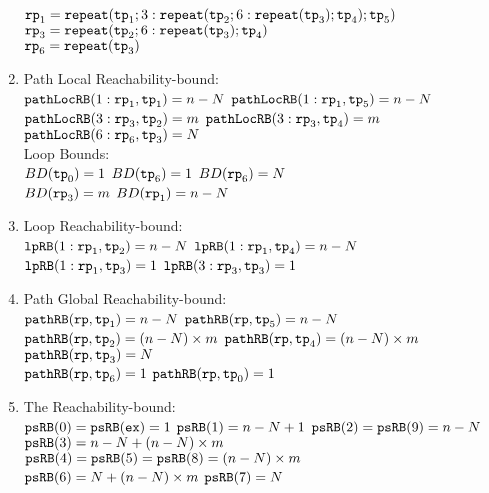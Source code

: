 \begin{enumerate}
$\mathtt{rp}_1 = \mathtt{repeat}(\mathtt{tp}_1; 3: \mathtt{repeat}(\mathtt{tp}_2; 6: \mathtt{repeat}(\mathtt{tp}_3); \mathtt{tp}_4); \mathtt{tp}_5)$
\\
$\mathtt{rp}_3 = \mathtt{repeat}(\mathtt{tp}_2; 6: \mathtt{repeat}(\mathtt{tp}_3); \mathtt{tp}_4)$
\\
$\mathtt{rp}_6 = \mathtt{repeat}(\mathtt{tp}_3)$
  \item {Path Local Reachability-bound}:
\\
$\mathtt{pathLocRB}(1: \mathtt{rp}_1, \mathtt{tp}_1) = n - N$ \quad
$\mathtt{pathLocRB}(1: \mathtt{rp}_1, \mathtt{tp}_5) = n - N$ \\
$\mathtt{pathLocRB}(3: \mathtt{rp}_3, \mathtt{tp}_2) = m$ \quad
$\mathtt{pathLocRB}(3: \mathtt{rp}_3, \mathtt{tp}_4) = m$ \\
$\mathtt{pathLocRB}(6: \mathtt{rp}_6, \mathtt{tp}_3) = N$ \quad
%
\\
Loop Bounds:
\\
$BD(\mathtt{tp}_0) = 1$
\quad
$BD(\mathtt{tp}_6) = 1$
\quad
$BD( \mathtt{rp}_6) = N $
\\
$BD(\mathtt{rp}_3) = m $
\quad
$BD(\mathtt{rp}_1) = n - N $
%
\item Loop Reachability-bound:
\\
$\mathtt{lpRB}(1: \mathtt{rp}_1, \mathtt{tp}_2) = n - N$ \quad 
$\mathtt{lpRB}(1: \mathtt{rp}_1, \mathtt{tp}_4) = n - N$ \\
$\mathtt{lpRB}(1: \mathtt{rp}_1, \mathtt{tp}_3) = 1$ \quad
$\mathtt{lpRB}(3: \mathtt{rp}_3, \mathtt{tp}_3) = 1$ \quad 
%
%
\item Path Global Reachability-bound:
\\
$\mathtt{pathRB}(\mathtt{rp}, \mathtt{tp}_1) = n - N$ \quad
$\mathtt{pathRB}(\mathtt{rp}, \mathtt{tp}_5) = n - N$ \quad
\\
$\mathtt{pathRB}(\mathtt{rp}, \mathtt{tp}_2) = (n - N) \times m$ \quad
$\mathtt{pathRB}(\mathtt{rp}, \mathtt{tp}_4) = (n - N) \times m$ 
\\
$\mathtt{pathRB}(\mathtt{rp}, \mathtt{tp}_3) = N$
\\
$\mathtt{pathRB}(\mathtt{rp}, \mathtt{tp}_6) = 1$ \quad
$\mathtt{pathRB}(\mathtt{rp}, \mathtt{tp}_0) = 1$ 
%
\item The Reachability-bound:
\\
$\mathtt{psRB}(0) = \mathtt{psRB}(\mathtt{ex}) = 1$ \quad
$\mathtt{psRB}(1) = n - N + 1$ \quad
$\mathtt{psRB}(2) = \mathtt{psRB}(9) = n - N$ \\
$\mathtt{psRB}(3) = n - N + (n - N) \times m$ \\
$\mathtt{psRB}(4) = \mathtt{psRB}(5) = \mathtt{psRB}(8) = (n - N) \times m$ \\
$\mathtt{psRB}(6) = N + (n - N) \times m$ \quad
$\mathtt{psRB}(7) = N$ \quad
\end{enumerate}